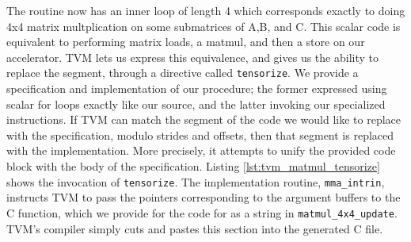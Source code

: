 \documentclass[acmsmall, nonacm=true]{acmart}
\begin{document}
The routine now has an inner loop of length 4 which corresponds exactly to doing 4x4 matrix multplication on some submatrices of A,B, and C. This scalar code is equivalent to performing matrix loads, a matmul, and then a store on our accelerator. TVM lets us express this equivalence, and gives us the ability to replace the segment, through a directive called \verb|tensorize|. We provide a specification and implementation of our procedure; the former expressed using scalar for loops exactly like our source, and the latter invoking our specialized instructions. If TVM can match the segment of the code we would like to replace with the specification, modulo strides and offsets, then that segment is replaced with the implementation. More precisely, it attempts to unify the provided code block with the body of the specification. Listing \ref{lst:tvm_matmul_tensorize} shows the invocation of \verb|tensorize|. The implementation routine, \verb|mma_intrin|, instructs TVM to pass the pointers corresponding to the argument buffers to the C function, which we provide for the code for as a string in \verb|matmul_4x4_update|. TVM's compiler simply cuts and pastes this section into the generated C file.
\end{document}
